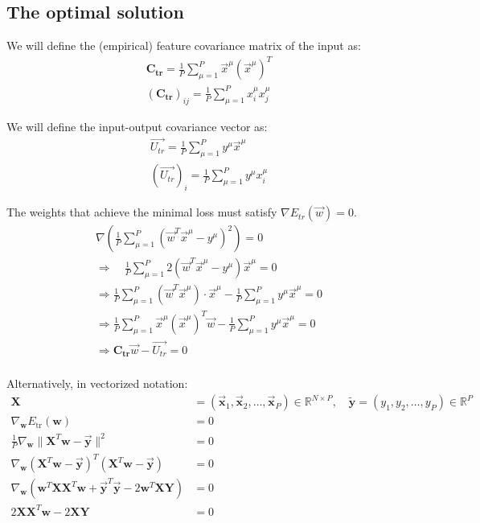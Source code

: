 \documentclass[11pt]{book} %
\begin{document}
%
%

\subsection{The optimal solution}

We will define the (empirical) feature covariance matrix of the input as:
\begin{align*}
    \mathbf{C_{tr}} = \frac{1}{P} \sum_{\mu=1}^{P} \vec{x}^\mu (\vec{x}^\mu)^T \\
    (\mathbf{C_{tr}})_{ij} = \frac{1}{P} \sum_{\mu=1}^{P} x_i^\mu x_j^\mu
\end{align*}

We will define the input-output covariance vector as:
\begin{align*}
    \vec{U_{tr}} = \frac{1}{P} \sum_{\mu=1}^{P} y^\mu \vec{x}^\mu \\
    (\vec{U_{tr}})_i = \frac{1}{P} \sum_{\mu=1}^{P} y^\mu x_i^\mu
\end{align*}

The weights that achieve the minimal loss must satisfy $\nabla E_{tr}(\vec{w}) = 0$. 
\begin{align*}
    \nabla \left(\frac{1}{P} \sum_{\mu=1}^{P} (\vec{w}^T \vec{x}^\mu - y^\mu)^2\right) = 0 \quad \\
    \Rightarrow \quad \frac{1}{P} \sum_{\mu=1}^{P} 2(\vec{w}^T \vec{x}^\mu - y^\mu) \vec{x}^\mu = 0 \\ 
    \Rightarrow \frac{1}{P} \sum_{\mu=1}^{P} (\vec{w}^T \vec{x}^\mu) \cdot \vec{x}^\mu  - \frac{1}{P} \sum_{\mu=1}^{P} y^\mu \vec{x}^\mu = 0 \\
    \Rightarrow \frac{1}{P} \sum_{\mu=1}^{P} \vec{x}^\mu (\vec{x}^\mu)^T \vec{w}  - \frac{1}{P} \sum_{\mu=1}^{P} y^\mu \vec{x}^\mu = 0 \\
    \Rightarrow \mathbf{C_{tr}} \vec{w} - \vec{U_{tr}} = 0 \\
\end{align*}

Alternatively, in vectorized notation:
\begin{align*}
    \mathbf{X} &= (\vec{\mathbf{x}}_1, \vec{\mathbf{x}}_2, \ldots, \vec{\mathbf{x}}_P) \in \mathbb{R}^{N \times P}, \quad
    \tilde{\mathbf{y}} = (y_1, y_2, \ldots, y_P) \in \mathbb{R}^P \\
    \nabla_{\mathbf{w}} E_{\text{tr}} (\mathbf{w}) &= 0 \\
    \frac{1}{P} \nabla_{\mathbf{w}} \lVert \mathbf{X}^T\mathbf{w} - \vec{\mathbf{y}} \rVert^2 &= 0 \\
    \nabla_{\mathbf{w}} (\mathbf{X}^T\mathbf{w} - \vec{\mathbf{y}})^T (\mathbf{X}^T\mathbf{w} - \vec{\mathbf{y}}) &= 0 \\
    \nabla_{\mathbf{w}} (\mathbf{w}^T\mathbf{X}\mathbf{X}^T\mathbf{w} + \vec{\mathbf{y}}^T\vec{\mathbf{y}} - 2\mathbf{w}^T\mathbf{X}\mathbf{Y}) &= 0 \\
    2\mathbf{X}\mathbf{X}^T\mathbf{w} - 2\mathbf{X}\mathbf{Y} &= 0 \\
\end{align*}
\end{document}
